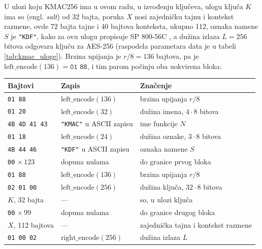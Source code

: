 \begin{example}
\label{ex:kmac_bajtovi}
U ulozi koju KMAC256 ima u ovom radu, u izvođenju ključeva, ulogu ključa $K$ ima so (engl. \textit{salt}) od 32 bajta, poruka $X$ nosi zajedničku tajnu i kontekst razmene, ovde 72 bajta tajne i 40 bajtova konteksta, ukupno 112, oznaka namene $S$ je \texttt{"KDF"}, kako za ovu ulogu propisuje SP 800-56C \cite{sp80056c}, a dužina izlaza $L = 256$ bitova odgovara ključu za AES-256 (raspodela parametara data je u tabeli \ref{tab:kmac_uloge}). Brzina upijanja je $r/8 = 136$ bajtova, pa je $\mathrm{left\_encode}(136) = \texttt{01 88}$, i tim parom počinju oba uokvirena bloka:
\begin{center}
\small
\setlength{\tabcolsep}{6pt}
\renewcommand{\arraystretch}{1.3}
\begin{tabular}{|l|l|l|}
\hline
\rowcolor{gray!30}
Bajtovi & Zapis & Značenje \\
\hline
\cellcolor{cyan!30}\texttt{01 88} & $\mathrm{left\_encode}(136)$ & brzina upijanja $r/8$ \\
\hline
\cellcolor{cyan!30}\texttt{01 20} & $\mathrm{left\_encode}(32)$ & dužina imena, $4 \cdot 8$ bitova \\
\hline
\cellcolor{cyan!30}\texttt{4B 4D 41 43} & \texttt{"KMAC"} u ASCII zapisu & ime funkcije $N$ \\
\hline
\cellcolor{cyan!30}\texttt{01 18} & $\mathrm{left\_encode}(24)$ & dužina oznake, $3 \cdot 8$ bitova \\
\hline
\cellcolor{cyan!30}\texttt{4B 44 46} & \texttt{"KDF"} u ASCII zapisu & oznaka namene $S$ \\
\hline
\cellcolor{gray!30}\texttt{00} $\times\,123$ & dopuna nulama & do granice prvog bloka \\
\hline
\cellcolor{purple!30}\texttt{01 88} & $\mathrm{left\_encode}(136)$ & brzina upijanja $r/8$ \\
\hline
\cellcolor{purple!30}\texttt{02 01 00} & $\mathrm{left\_encode}(256)$ & dužina ključa, $32 \cdot 8$ bitova \\
\hline
\cellcolor{purple!30}$K$, 32 bajta & --- & so, u ulozi ključa \\
\hline
\cellcolor{gray!30}\texttt{00} $\times\,99$ & dopuna nulama & do granice drugog bloka \\
\hline
\cellcolor{green!30}$X$, 112 bajtova & --- & zajednička tajna i kontekst razmene \\
\hline
\cellcolor{yellow!30}\texttt{01 00 02} & $\mathrm{right\_encode}(256)$ & dužina izlaza $L$ \\

\end{tabular}
\end{center}
\end{example}
